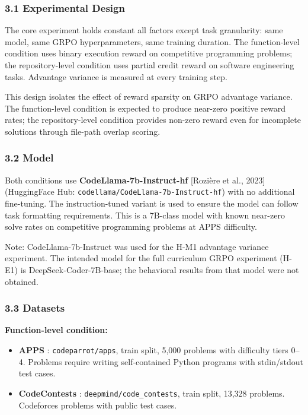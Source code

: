 
\subsubsection{3.1 Experimental Design}

The core experiment holds constant all factors except task granularity: same model, same GRPO hyperparameters, same training duration. The function-level condition uses binary execution reward on competitive programming problems; the repository-level condition uses partial credit reward on software engineering tasks. Advantage variance is measured at every training step.

This design isolates the effect of reward sparsity on GRPO advantage variance. The function-level condition is expected to produce near-zero positive reward rates; the repository-level condition provides non-zero reward even for incomplete solutions through file-path overlap scoring.

\subsubsection{3.2 Model}

Both conditions use \textbf{CodeLlama-7b-Instruct-hf} [Rozière et al., 2023] (HuggingFace Hub: \texttt{codellama/CodeLlama-7b-Instruct-hf}) with no additional fine-tuning. The instruction-tuned variant is used to ensure the model can follow task formatting requirements. This is a 7B-class model with known near-zero solve rates on competitive programming problems at APPS difficulty.

Note: CodeLlama-7b-Instruct was used for the H-M1 advantage variance experiment. The intended model for the full curriculum GRPO experiment (H-E1) is DeepSeek-Coder-7B-base; the behavioral results from that model were not obtained.

\subsubsection{3.3 Datasets}

\textbf{Function-level condition:}
\begin{itemize}
\item \textbf{APPS} \citep{Hendrycksetal2021}: \texttt{codeparrot/apps}, train split, 5,000 problems with difficulty tiers 0–4. Problems require writing self-contained Python programs with stdin/stdout test cases.
\item \textbf{CodeContests} \citep{Lietal2022}: \texttt{deepmind/code_contests}, train split, 13,328 problems. Codeforces problems with public test cases.
\end{itemize}

